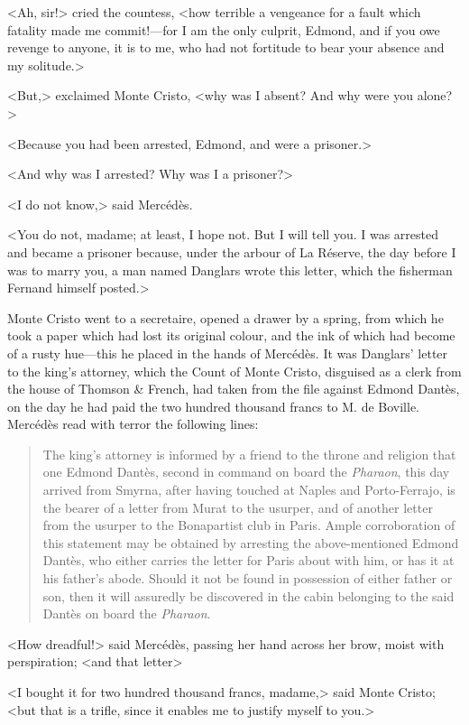  <Ah, sir!> cried the countess, <how terrible a vengeance for a fault which fatality made me commit!—for I am the only culprit, Edmond, and if you owe revenge to anyone, it is to me, who had not fortitude to bear your absence and my solitude.> 

 <But,> exclaimed Monte Cristo, <why was I absent? And why were you alone?>

<Because you had been arrested, Edmond, and were a prisoner.> 

 <And why was I arrested? Why was I a prisoner?> 

 <I do not know,> said Mercédès. 

 <You do not, madame; at least, I hope not. But I will tell you. I was arrested and became a prisoner because, under the arbour of La Réserve, the day before I was to marry you, a man named Danglars wrote this letter, which the fisherman Fernand himself posted.> 

 Monte Cristo went to a secretaire, opened a drawer by a spring, from which he took a paper which had lost its original colour, and the ink of which had become of a rusty hue—this he placed in the hands of Mercédès. It was Danglars' letter to the king's attorney, which the Count of Monte Cristo, disguised as a clerk from the house of Thomson \& French, had taken from the file against Edmond Dantès, on the day he had paid the two hundred thousand francs to M. de Boville. Mercédès read with terror the following lines: 
 
 \begin{quote}
The king's attorney is informed by a friend to the throne and religion that one Edmond Dantès, second in command on board the \textit{Pharaon}, this day arrived from Smyrna, after having touched at Naples and Porto-Ferrajo, is the bearer of a letter from Murat to the usurper, and of another letter from the usurper to the Bonapartist club in Paris. Ample corroboration of this statement may be obtained by arresting the above-mentioned Edmond Dantès, who either carries the letter for Paris about with him, or has it at his father's abode. Should it not be found in possession of either father or son, then it will assuredly be discovered in the cabin belonging to the said Dantès on board the \textit{Pharaon}.
\end{quote}

 <How dreadful!> said Mercédès, passing her hand across her brow, moist with perspiration; <and that letter\longdash> 

 <I bought it for two hundred thousand francs, madame,> said Monte Cristo; <but that is a trifle, since it enables me to justify myself to you.> 


